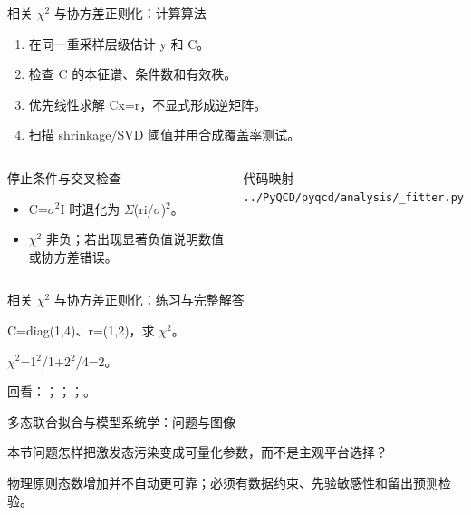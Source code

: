 \begin{frame}[t]{相关 \ensuremath{\chi}\ensuremath{^{2}} 与协方差正则化：计算算法}
\footnotesize
{}\begin{enumerate}
\item 在同一重采样层级估计 y 和 C。
\item 检查 C 的本征谱、条件数和有效秩。
\item 优先线性求解 Cx=r，不显式形成逆矩阵。
\item 扫描 shrinkage/\allowbreak{}SVD 阈值并用合成覆盖率测试。
\end{enumerate}\begin{columns}[T,onlytextwidth]
\begin{block}{停止条件与交叉检查}\scriptsize\begin{itemize}
\item[\CheckMark] C=\ensuremath{\sigma}\ensuremath{^{2}}I 时退化为 \ensuremath{\Sigma}(ri/\allowbreak{}\ensuremath{\sigma})\ensuremath{^{2}}。
\item[\CheckMark] \ensuremath{\chi}\ensuremath{^{2}} 非负；若出现显著负值说明数值或协方差错误。
\end{itemize}\end{block}
\begin{block}{代码映射}
\scriptsize \texttt{.\allowbreak{}.\allowbreak{}/\allowbreak{}PyQCD/\allowbreak{}pyqcd/\allowbreak{}analysis/\allowbreak{}\_\allowbreak{}fitter.\allowbreak{}py}
\end{block}\end{columns}\end{frame}

\begin{frame}[t]{相关 \ensuremath{\chi}\ensuremath{^{2}} 与协方差正则化：练习与完整解答}
\footnotesize
\begin{block}{}C=diag(1,4)、r=(1,2)，求 \ensuremath{\chi}\ensuremath{^{2}}。\end{block}
\begin{exampleblock}{}\ensuremath{\chi}\ensuremath{^{2}}=1\ensuremath{^{2}}/\allowbreak{}1+2\ensuremath{^{2}}/\allowbreak{}4=2。\end{exampleblock}
\vfill
\scriptsize 回看：；；；。
\end{frame}

\begin{frame}[t]{多态联合拟合与模型系统学：问题与图像}
\footnotesize
\begin{block}{本节问题}怎样把激发态污染变成可量化参数，而不是主观平台选择？\end{block}
\begin{block}{物理原则}\quad 态数增加并不自动更可靠；必须有数据约束、先验敏感性和留出预测检验。\end{block}
\end{frame}

